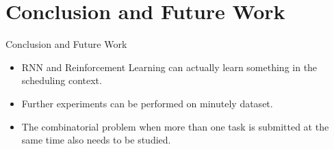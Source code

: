 \section{Conclusion and Future Work}

\begin{frame}{Conclusion and Future Work}
  \begin{itemize}
    \item RNN and Reinforcement Learning can actually learn something in the scheduling context.
    \item Further experiments can be performed on minutely dataset.
    \item The combinatorial problem when more than one task is submitted at the same time also needs to be studied.
  \end{itemize}
\end{frame}

